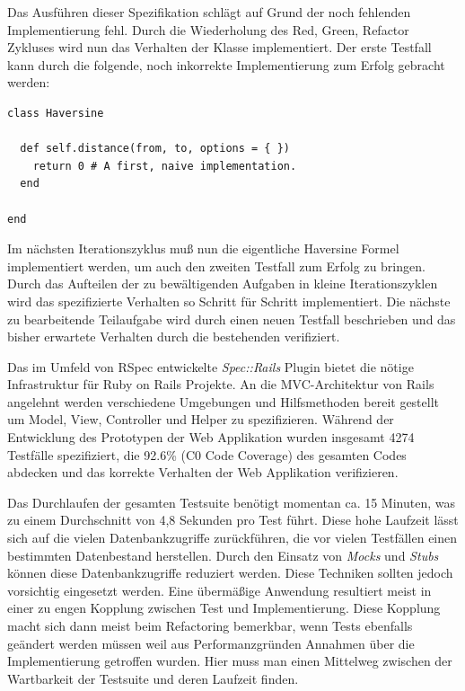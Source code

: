 Das Ausführen dieser Spezifikation schlägt auf Grund der noch
fehlenden Implementierung fehl. Durch die Wiederholung des Red, Green,
Refactor Zykluses wird nun das Verhalten der Klasse implementiert. Der
erste Testfall kann durch die folgende, noch inkorrekte
Implementierung zum Erfolg gebracht werden:

\begin{lstlisting}
class Haversine

  def self.distance(from, to, options = { })
    return 0 # A first, naive implementation.
  end

end
\end{lstlisting}

Im nächsten Iterationszyklus muß nun die eigentliche Haversine Formel
\cite{wiki:haversine} implementiert werden, um auch den zweiten
Testfall zum Erfolg zu bringen. Durch das Aufteilen der zu
bewältigenden Aufgaben in kleine Iterationszyklen wird das
spezifizierte Verhalten so Schritt für Schritt implementiert. Die
nächste zu bearbeitende Teilaufgabe wird durch einen neuen Testfall
beschrieben und das bisher erwartete Verhalten durch die bestehenden
verifiziert.

Das im Umfeld von RSpec entwickelte \textit{Spec::Rails} Plugin bietet
die nötige Infrastruktur für Ruby on Rails Projekte. An die
MVC-Architektur von Rails angelehnt werden verschiedene Umgebungen und
Hilfsmethoden bereit gestellt um Model, View, Controller und Helper zu
spezifizieren. Während der Entwicklung des Prototypen der Web
Applikation wurden insgesamt 4274 Testfälle spezifiziert, die 92.6\%
(C0 Code Coverage) des gesamten Codes abdecken und das korrekte
Verhalten der Web Applikation verifizieren.

Das Durchlaufen der gesamten Testsuite benötigt momentan ca. 15
Minuten, was zu einem Durchschnitt von 4,8 Sekunden pro Test
führt. Diese hohe Laufzeit lässt sich auf die vielen Datenbankzugriffe
zurückführen, die vor vielen Testfällen einen bestimmten Datenbestand
herstellen. Durch den Einsatz von \textit{Mocks} und \textit{Stubs}
können diese Datenbankzugriffe reduziert werden. Diese Techniken
sollten jedoch vorsichtig eingesetzt werden. Eine übermäßige Anwendung
resultiert meist in einer zu engen Kopplung zwischen Test und
Implementierung. Diese Kopplung macht sich dann meist beim Refactoring
bemerkbar, wenn Tests ebenfalls geändert werden müssen weil aus
Performanzgründen Annahmen über die Implementierung getroffen
wurden. Hier muss man einen Mittelweg zwischen der Wartbarkeit der
Testsuite und deren Laufzeit finden.

